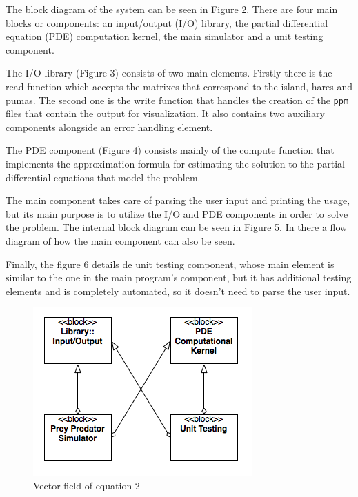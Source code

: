 \documentclass[12pt,a4paper]{article}
\begin{document}
The block diagram of the system can be seen in Figure 2. There are four main blocks or components: an input/output (I/O) library, the partial differential equation (PDE) computation kernel, the main simulator and a unit testing component.

The I/O library (Figure 3) consists of two main elements. Firstly there is the read function which accepts the matrixes that correspond to the island, hares and pumas. The second one is the write function that handles the creation of the \texttt{ppm} files that contain the output for visualization. It also contains two auxiliary components alongside an error handling element.

The PDE component (Figure 4) consists mainly of the compute function that implements the approximation formula for estimating the solution to the partial differential equations that model the problem.

The main component takes care of parsing the user input and printing the usage, but its main purpose is to utilize the I/O and PDE components in order to solve the problem. The internal block diagram can be seen in Figure 5. In there a flow diagram of how the main component can also be seen.

Finally, the figure 6 details de unit testing component, whose main element is similar to the one in the main program's component, but it has additional testing elements and is completely automated, so it doesn't need to parse the user input.


\begin{figure}[hb]
    \centering
    \includegraphics[scale=0.6]{images/blockdesign.png}
    \caption{Vector field of equation 2}
\end{figure}
\end{document}
